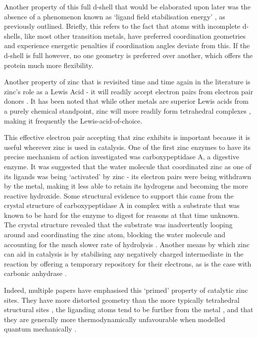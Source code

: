 Another property of this full d-shell that would be elaborated upon later was the absence of a phenomenon known as `ligand field stabilisation energy' \cite{lachenmann2004zinc,vahrenkamp2007does,maret2009coordination,krkezel2016biological}, as previously outlined. Briefly, this refers to the fact that atoms with incomplete d-shells, like most other transition metals, have preferred coordination geometries and experience energetic penalties if coordination angles deviate from this. If the d-shell is full however, no one geometry is preferred over another, which offers the protein much more flexibility.

Another property of zinc that is revisited time and time again in the literature is zinc's role as a Lewis Acid - it will readily accept electron pairs from electron pair donors \cite{williams1984zinc}. It has been noted that while other metals are superior Lewis acids from a purely chemical standpoint, zinc will more readily form tetrahedral complexes \cite{bertini1985zinc}, making it frequently the Lewis-acid-of-choice.

This effective electron pair accepting that zinc exhibits is important because it is useful wherever zinc is used in catalysis. One of the first zinc enzymes to have its precise mechanism of action investigated was carboxypeptidase A, a digestive enzyme. It was suggested that the water molecule that coordinated zinc as one of its ligands was being `activated' by zinc - its electron pairs were being withdrawn by the metal, making it less able to retain its hydrogens and becoming the more reactive hydroxide. Some structural evidence to support this came from the crystal structure of carboxypeptidase A in complex with a substrate that was known to be hard for the enzyme to digest for reasons at that time unknown. The crystal structure revealed that the substrate was inadvertently looping around and coordinating the zinc atom, blocking the water molecule and accounting for the much slower rate of hydrolysis \cite{christianson1986x}. Another means by which zinc can aid in catalysis is by stabilising any negatively charged intermediate in the reaction by offering a temporary repository for their electrons, as is the case with carbonic anhydrase \cite{christianson1996carbonic}.

Indeed, multiple papers have emphasised this `primed' property of catalytic zinc sites. They have more distorted geometry than the more typically tetrahedral structural sites \cite{roe1999zinc}, the liganding atoms tend to be further from the metal \cite{lee2008physical}, and that they are generally more thermodynamically unfavourable when modelled quantum mechanically \cite{sousa2009zinc}.

